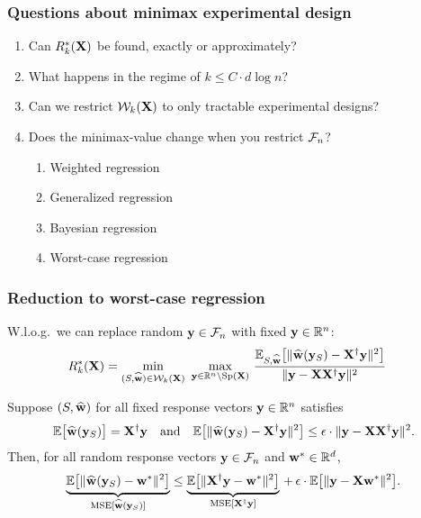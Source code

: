 \documentclass{beamer}
\begin{document}
\begin{frame}
  \frametitle{Questions about minimax experimental design}
  \begin{enumerate}
  \item Can $R_k^*(\mathbf X)$ be found, exactly or approximately?\\[4mm]
    \pause
  \item What happens in the regime of $k\leq C\cdot d\log n$?\\[4mm]
    \pause
  \item
Can we restrict $\mathcal{W}_k(\mathbf X)$ to only tractable experimental designs?\\[4mm]
\pause
  \item Does the minimax-value change when you restrict $\mathcal{F}_n$?\\[1mm]
    \pause
    \begin{enumerate}
    \item Weighted regression\\[1mm]
    \item Generalized regression\\[1mm]
    \item Bayesian regression\\[1mm]
    \item Worst-case regression
      \end{enumerate}
  \end{enumerate}
\end{frame}

\begin{frame}
  \frametitle{Reduction to worst-case regression}
  \begin{theorem}
    W.l.o.g.~we can replace random $\mathbf y\in\mathcal{F}_n$ with fixed $\mathbf y\in\mathbb R^n$:
    \begin{align*}
R_k^*(\X)&=
  \min_{(S,\wbh)\in\Wc_k(\X)}\ \max_{\y\in\R^n\backslash\mathrm{Sp}(\X)}\,\frac{\E_{S,\wbh}\big[\|\wbh(\y_S)-\X^\dagger\y\|^2\big]
  }{\|\y-\X\X^\dagger\y\|^2}     
    \end{align*}
  \end{theorem}
  \pause  \vspace{4mm}
Suppose  $(S,\widehat{\mathbf w})$ for all fixed response vectors $\mathbf y\in\mathbb R^n$ satisfies 
  \begin{align*}
    \mathbb E\big[\widehat{\mathbf w}(\mathbf y_S)\big]=\mathbf X^\dagger\mathbf y\quad\text{and}\quad
    \mathbb E\big[\|\widehat{\mathbf w}(\mathbf y_S)-\mathbf X^\dagger\mathbf y\|^2\big]\leq
    \epsilon\cdot\|\mathbf y-\mathbf X\mathbf X^\dagger\mathbf y\|^2.
  \end{align*}
  \pause
Then, for all random response vectors $\mathbf y\in \mathcal{F}_n$ and $\mathbf w^*\in\mathbb R^d$,
  \begin{align*}
    \underbrace{\mathbb E\big[\|\widehat{\mathbf w}(\mathbf y_S)-\mathbf w^*\|^2\big]}_{\mathrm{MSE}[\widehat{\mathbf w}(\mathbf y_S)]}
    \leq
    \underbrace{\mathbb E\big[\|\mathbf X^\dagger\mathbf y-\mathbf w^*\|^2\big]}_{\mathrm{MSE}[\mathbf X^\dagger\mathbf y]}
    \,+\,\epsilon\cdot \mathbb E\big[\|\mathbf y-\mathbf X\mathbf w^*\|^2\big].
  \end{align*}
\end{frame}
\end{document}
